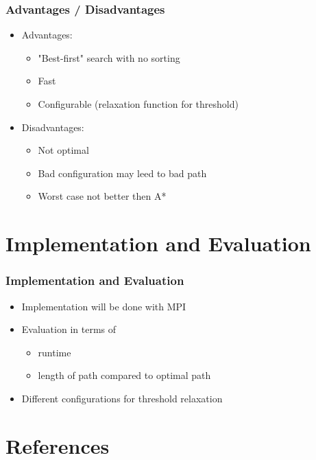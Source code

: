 \documentclass{beamer}
\begin{document}
\begin{frame}
\frametitle{Advantages / Disadvantages}
\begin{itemize}
\item Advantages:
	\begin{itemize}
	\item "Best-first" search with no sorting
	\item Fast
	\item Configurable (relaxation function for threshold)
	\end{itemize}
\item Disadvantages:
	\begin{itemize}
	\item Not optimal
	\item Bad configuration may leed to bad path
	\item Worst case not better then A*
	\end{itemize}
\end{itemize}
\end{frame}



\section{Implementation and Evaluation}

\begin{frame}
\frametitle{Implementation and Evaluation}
\begin{itemize}
\item Implementation will be done with MPI
\item Evaluation in terms of
	\begin{itemize}
	\item runtime
	\item length of path compared to optimal path
	\end{itemize}
\item Different configurations for threshold relaxation
\end{itemize}
\end{frame}


\section{References}
\end{document}
